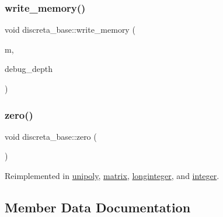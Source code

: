 \mbox{\label{classdiscreta__base_a449ed7914b693346288f56a60b12c4af}} 
\subsubsection{\texorpdfstring{write\+\_\+memory()}{write\_memory()}}
{\footnotesize\ttfamily void discreta\+\_\+base\+::write\+\_\+memory (\begin{DoxyParamCaption}\item[{\mbox{\hyperlink{classmemory}{memory}} \&}]{m,  }\item[{\mbox{\hyperlink{galois_8h_a09fddde158a3a20bd2dcadb609de11dc}{I\+NT}}}]{debug\+\_\+depth }\end{DoxyParamCaption})}

\mbox{\label{classdiscreta__base_a424aa44bbb6ca48d30ad1087dbd6f210}} 
\subsubsection{\texorpdfstring{zero()}{zero()}}
{\footnotesize\ttfamily void discreta\+\_\+base\+::zero (\begin{DoxyParamCaption}{ }\end{DoxyParamCaption})\hspace{0.3cm}{\ttfamily [virtual]}}



Reimplemented in \mbox{\hyperlink{classunipoly_a8fd1c1a5602dc59b0e1a68bee23d60b6}{unipoly}}, \mbox{\hyperlink{classmatrix_abd2e274d4905bc97eabf7c72d5e66b3d}{matrix}}, \mbox{\hyperlink{classlonginteger_a082d0c05f45c21f188e17a8463a42800}{longinteger}}, and \mbox{\hyperlink{classinteger_ab99e796e5c2cef13eb30dc43eac3c9fe}{integer}}.



\subsection{Member Data Documentation}
\mbox{\label{classdiscreta__base_a6f7a0f7bdd115b9e4dde358cfa7ebf81}} 
